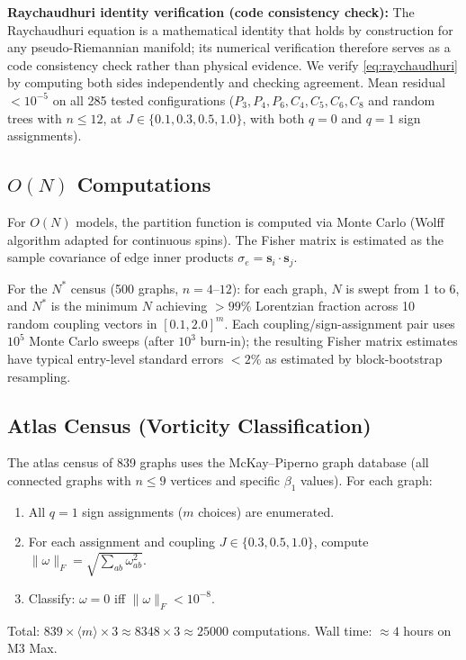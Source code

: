 \documentclass[11pt]{article}
\theoremstyle{definition}
\theoremstyle{remark}
\newcommand{\vort}{\omega}
\newcommand{\edgeo}{\sigma}
\newcommand{\betti}{\beta_1}
\begin{document}
\textbf{Raychaudhuri identity verification (code consistency check):}
The Raychaudhuri equation is a mathematical identity that holds by
construction for any pseudo-Riemannian manifold; its numerical
verification therefore serves as a code consistency check rather than
physical evidence.  We verify \eqref{eq:raychaudhuri} by computing
both sides independently and checking agreement. Mean residual
$< 10^{-5}$ on all 285 tested configurations ($P_3, P_4, P_6, C_4,
C_5, C_6, C_8$ and random trees with $n \leq 12$, at
$J \in \{0.1, 0.3, 0.5, 1.0\}$, with both $q = 0$ and $q = 1$
sign assignments).

\subsection{$O(N)$ Computations}

For $O(N)$ models, the partition function is computed via Monte Carlo
(Wolff algorithm adapted for continuous spins). The Fisher matrix is
estimated as the sample covariance of edge inner products
$\edgeo_e = \mathbf{s}_i \cdot \mathbf{s}_j$.

For the $N^*$ census (500 graphs, $n = 4$--$12$): for each graph,
$N$ is swept from 1 to 6, and $N^*$ is the minimum $N$ achieving
$> 99\%$ Lorentzian fraction across 10 random coupling vectors in
$[0.1, 2.0]^m$. Each coupling/sign-assignment pair uses $10^5$ Monte
Carlo sweeps (after $10^3$ burn-in); the resulting Fisher matrix
estimates have typical entry-level standard errors $< 2\%$ as estimated
by block-bootstrap resampling.

\subsection{Atlas Census (Vorticity Classification)}

The atlas census of 839 graphs uses the McKay--Piperno graph database
(all connected graphs with $n \leq 9$ vertices and specific $\betti$
values). For each graph:
\begin{enumerate}
\item All $q = 1$ sign assignments ($m$ choices) are enumerated.
\item For each assignment and coupling $J \in \{0.3, 0.5, 1.0\}$,
  compute $\|\vort\|_F = \sqrt{\sum_{ab} \vort_{ab}^2}$.
\item Classify: $\vort = 0$ iff $\|\vort\|_F < 10^{-8}$.
\end{enumerate}
Total: $839 \times \langle m \rangle \times 3 \approx 8348 \times 3
\approx 25000$ computations. Wall time: $\approx 4$ hours on M3 Max.
\end{document}
